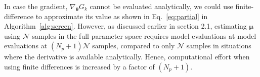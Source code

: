 %
%
%    

\bigskip

In case the gradient, $\nabla_{\bm{\theta}}G_k$ cannot be evaluated analytically, we could use finite-difference
to approximate its value as shown in Eq.~\ref{eq:partial} in Algorithm~\ref{alg:screen}. However, as discussed earlier
in section 2.1, estimating $\bm{\mu}$  using $\mathcal{N}$ samples in the full parameter space requires 
model evaluations at model evaluations at $(N_p+1)\mathcal{N}$ samples, compared to only $\mathcal{N}$ samples in 
situations where the derivative is available analytically. Hence, computational effort when using finite differences
is increased by a factor of $(N_p+1)$. 

